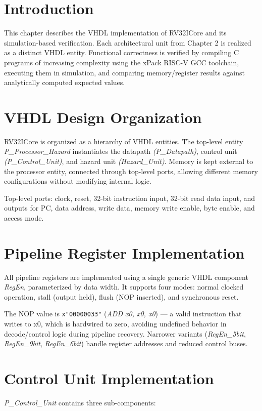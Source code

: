 \section{Introduction}
This chapter describes the VHDL implementation of RV32ICore and its simulation-based verification. Each architectural unit from Chapter 2 is realized as a distinct VHDL entity. Functional correctness is verified by compiling C programs of increasing complexity using the xPack RISC-V GCC toolchain, executing them in simulation, and comparing memory/register results against analytically computed expected values.

\section{VHDL Design Organization}
RV32ICore is organized as a hierarchy of VHDL entities. The top-level entity \textit{P\_Processor\_Hazard} instantiates the datapath \textit{(P\_Datapath)}, control unit \textit{(P\_Control\_Unit)}, and hazard unit \textit{(Hazard\_Unit)}. Memory is kept external to the processor entity, connected through top-level ports, allowing different memory configurations without modifying internal logic.

Top-level ports: clock, reset, 32-bit instruction input, 32-bit read data input, and outputs for PC, data address, write data, memory write enable, byte enable, and access mode.

\section{Pipeline Register Implementation}
All pipeline registers are implemented using a single generic VHDL component \textit{RegEn}, parameterized by data width. It supports four modes: normal clocked operation, stall (output held), flush (NOP inserted), and synchronous reset.

The NOP value is \texttt{x"00000033"} (\textit{ADD x0, x0, x0}) — a valid instruction that writes to x0, which is hardwired to zero, avoiding undefined behavior in decode/control logic during pipeline recovery. Narrower variants (\textit{RegEn\_5bit}, \textit{RegEn\_9bit}, \textit{RegEn\_6bit}) handle register addresses and reduced control buses.

\section{Control Unit Implementation}
\textit{P\_Control\_Unit} contains three sub-components:

